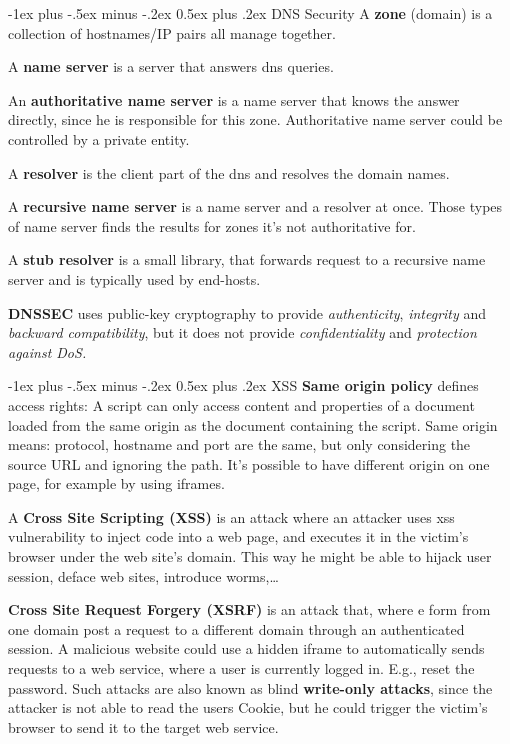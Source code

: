 \documentclass[a4paper,twocolumn]{article}
\makeatletter
\renewcommand{\section}{%
    \@startsection{section}{1}{0mm}%
    {-1ex plus -.5ex minus -.2ex}%
    {0.5ex plus .2ex}%
    {\normalfont\normalsize\bfseries\sectionrule{12pt}{0.4pt}{0pt}{0pt}}
}
\makeatother
\begin{document}
\begin{footnotesize}
\section{DNS Security}
A \textbf{zone} (domain) is a collection of hostnames/IP pairs all manage together.

A \textbf{name server} is a server that answers dns queries.

An \textbf{authoritative name server} is a name server that knows the answer directly, since he is responsible for this zone. Authoritative name server could be controlled by a private entity.

A \textbf{resolver} is the client part of the dns and resolves the domain names.

A \textbf{recursive name server} is a name server and a resolver at once. Those types of name server finds the results for zones it's not authoritative for.

A \textbf{stub resolver} is a small library, that forwards request to a recursive name server and is typically used by end-hosts.

\textbf{DNSSEC} uses public-key cryptography to provide \textit{authenticity}, \textit{integrity} and \textit{backward compatibility}, but it does not provide \textit{confidentiality} and \textit{protection against DoS.}

\section{XSS}
\textbf{Same origin policy} defines access rights: A script can only access content and properties of a document loaded from the same origin as the document containing the script. Same origin means: protocol, hostname and port are the same, but only considering the source URL and ignoring the path. It's possible to have different origin on one page, for example by using iframes.

A \textbf{Cross Site Scripting (XSS)} is an attack where an attacker uses xss vulnerability to inject code into a web page, and executes it in the victim's browser under the web site's domain. This way he might be able to hijack user session, deface web sites, introduce worms,\ldots 

\textbf{Cross Site Request Forgery (XSRF)} is an attack that, where e form from one domain post a request to a different domain through an authenticated session. A malicious website could use a hidden iframe to automatically sends requests to a web service, where a user is currently logged in. E.g., reset the password. Such attacks are also known as blind \textbf{write-only attacks}, since the attacker is not able to read the users Cookie, but he could trigger the victim's browser to send it to the target web service.


\end{footnotesize}
\end{document}
